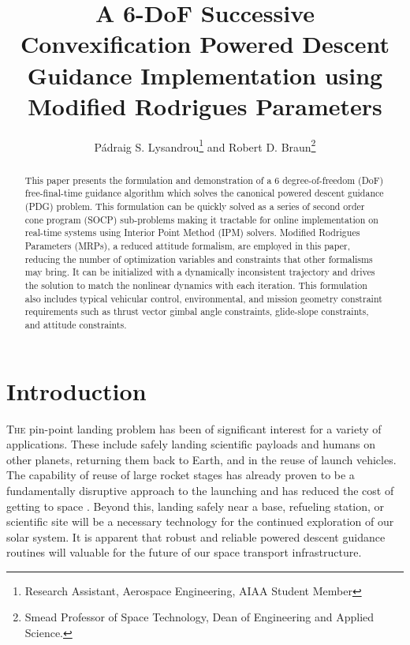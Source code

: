 \documentclass[conf]{new-aiaa}
\title{A 6-DoF Successive Convexification Powered Descent Guidance Implementation using Modified Rodrigues Parameters}
\author{Pádraig S. Lysandrou\footnote{Research Assistant, Aerospace Engineering, AIAA Student Member} and Robert D. Braun\footnote{Smead Professor of Space Technology, Dean of Engineering and Applied Science.}}
\affil{University of Colorado Boulder, Boulder, CO 80309}
\begin{document}
\maketitle

\begin{abstract}
	This paper presents the formulation and demonstration of a 6 degree-of-freedom (DoF) free-final-time guidance algorithm which solves the canonical powered descent guidance (PDG) problem. This formulation can be quickly solved as a series of second order cone program (SOCP) sub-problems making it tractable for online implementation on real-time systems using Interior Point Method (IPM) solvers. Modified Rodrigues Parameters (MRPs), a reduced attitude formalism, are employed in this paper, reducing the number of optimization variables and constraints that other formalisms may bring. It can be initialized with a dynamically inconsistent trajectory and drives the solution to match the nonlinear dynamics with each iteration. This formulation also includes typical vehicular control, environmental, and mission geometry constraint requirements such as thrust vector gimbal angle constraints, glide-slope constraints, and attitude constraints. 

\end{abstract}


\section{Introduction}
\lettrine{T}{he} pin-point landing problem has been of significant interest for a variety of applications. These include safely landing scientific payloads and humans on other planets, returning them back to Earth, and in the reuse of launch vehicles. The capability of reuse of large rocket stages has already proven to be a fundamentally disruptive approach to the launching and has reduced the cost of getting to space \cite{jones2018recent}. Beyond this, landing safely near a base, refueling station, or scientific site will be a necessary technology for the continued exploration of our solar system. It is apparent that robust and reliable powered descent guidance routines will valuable for the future of our space transport infrastructure.

\end{document}
